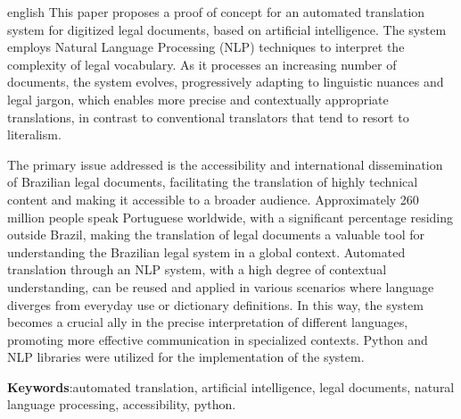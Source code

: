 


\begin{resumo}[Abstract]
 \begin{otherlanguage*}{english}
This paper proposes a proof of concept for an automated translation system for digitized legal documents, based on artificial intelligence. The system employs Natural Language Processing (NLP) techniques to interpret the complexity of legal vocabulary. As it processes an increasing number of documents, the system evolves, progressively adapting to linguistic nuances and legal jargon, which enables more precise and contextually appropriate translations, in contrast to conventional translators that tend to resort to literalism.

The primary issue addressed is the accessibility and international dissemination of Brazilian legal documents, facilitating the translation of highly technical content and making it accessible to a broader audience. Approximately 260 million people speak Portuguese worldwide, with a significant percentage residing outside Brazil, making the translation of legal documents a valuable tool for understanding the Brazilian legal system in a global context. Automated translation through an NLP system, with a high degree of contextual understanding, can be reused and applied in various scenarios where language diverges from everyday use or dictionary definitions. In this way, the system becomes a crucial ally in the precise interpretation of different languages, promoting more effective communication in specialized contexts. 
Python and NLP libraries were utilized for the implementation of the system.
   \vspace{\onelineskip}
 
   \noindent 
   \textbf{Keywords}:automated translation, artificial intelligence, legal documents, natural language processing, accessibility, python.
 \end{otherlanguage*}
\end{resumo}

% 
%
%  
